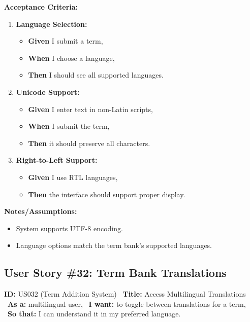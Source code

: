 \documentclass[12pt]{article}
\begin{document}
\vspace{1em}
\textbf{Acceptance Criteria:}
\begin{enumerate}
\item \textbf{Language Selection:}
\begin{itemize}
\item \textbf{Given} I submit a term,
\item \textbf{When} I choose a language,
\item \textbf{Then} I should see all supported languages.
\end{itemize}

\item \textbf{Unicode Support:}
\begin{itemize}
    \item \textbf{Given} I enter text in non-Latin scripts,
    \item \textbf{When} I submit the term,
    \item \textbf{Then} it should preserve all characters.
\end{itemize}

\item \textbf{Right-to-Left Support:}
\begin{itemize}
    \item \textbf{Given} I use RTL languages,
    \item \textbf{Then} the interface should support proper display.
\end{itemize}
\end{enumerate}

\vspace{1em}
\textbf{Notes/Assumptions:}
\begin{itemize}
\item System supports UTF-8 encoding.
\item Language options match the term bank's supported languages.
\end{itemize}

\subsection{User Story \#32: Term Bank Translations}
\textbf{ID:} US032 (Term Addition System) \
\textbf{Title:} Access Multilingual Translations \
\textbf{As a:} multilingual user, \
\textbf{I want:} to toggle between translations for a term, \
\textbf{So that:} I can understand it in my preferred language.
\end{document}
